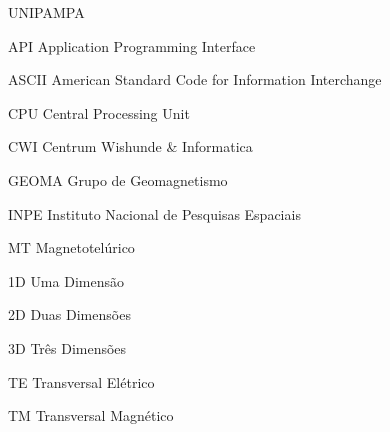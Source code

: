 \documentclass[csgeo,tcc]{unipampa}
\begin{document}
\begin{listofabbrv}{UNIPAMPA}
        
        \item[API]          {Application Programming Interface}
        \item[ASCII]        {American Standard Code for Information Interchange}
        \item[CPU]          {Central Processing Unit}
        \item[CWI]          {Centrum Wishunde \& Informatica}
        \item[GEOMA]        {Grupo de Geomagnetismo}
        \item[INPE]         {Instituto Nacional de Pesquisas Espaciais}
        \item[MT]           {Magnetotelúrico}
        \item[1D]           {Uma Dimensão}
        \item[2D]           {Duas Dimensões}
        \item[3D]           {Três Dimensões}
        \item[TE]           {Transversal Elétrico}
        \item[TM]           {Transversal Magnético}
        
\end{listofabbrv}







\end{document}
